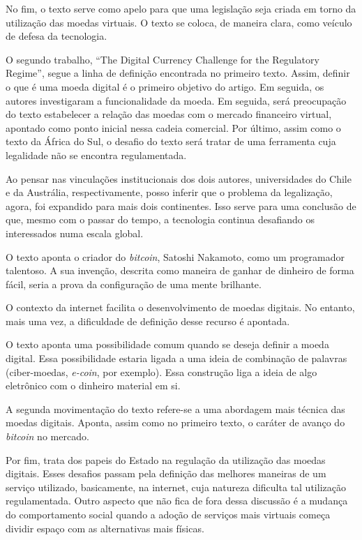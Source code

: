 \documentclass[12pt]{article}
\begin{document}
No fim, o texto serve como apelo para que uma legislação seja criada em torno da utilização das moedas virtuais. O texto se coloca, de maneira clara, como veículo de defesa da tecnologia.

O segundo trabalho, “The Digital Currency Challenge for the Regulatory Regime”, segue a linha de definição encontrada no primeiro texto. Assim, definir o que é uma moeda digital é o primeiro objetivo do artigo. Em seguida, os autores investigaram a funcionalidade da moeda. Em seguida, será preocupação do texto estabelecer a relação das moedas com o mercado financeiro virtual, apontado como ponto inicial nessa cadeia comercial. Por último, assim como o texto da África do Sul, o desafio do texto será tratar de uma ferramenta cuja legalidade não se encontra regulamentada.

Ao pensar nas vinculações institucionais dos dois autores, universidades do Chile e da Austrália, respectivamente, posso inferir que o problema da legalização, agora, foi expandido para mais dois continentes. Isso serve para uma conclusão de que, mesmo com o passar do tempo, a tecnologia continua desafiando os interessados numa escala global.

O texto aponta o criador do \textit{bitcoin}, Satoshi Nakamoto, como um programador talentoso. A sua invenção, descrita como maneira de ganhar de dinheiro de forma fácil, seria a prova da configuração de uma mente brilhante.

O contexto da internet facilita o desenvolvimento de moedas digitais. No entanto, mais uma vez, a dificuldade de definição desse recurso é apontada.

O texto aponta uma possibilidade comum quando se deseja definir a moeda digital. Essa possibilidade estaria ligada a uma ideia  de combinação de palavras (ciber-moedas, \textit{e-coin}, por exemplo). Essa construção liga a ideia de algo eletrônico com o dinheiro material em si. 

A segunda movimentação do texto refere-se a uma abordagem mais técnica das moedas digitais. Aponta, assim como no primeiro texto, o caráter de avanço do \textit{bitcoin} no mercado.

Por fim, trata dos papeis do Estado na regulação da utilização das moedas digitais. Esses desafios passam pela definição das melhores maneiras de um serviço utilizado, basicamente, na internet, cuja natureza dificulta tal utilização regulamentada. Outro aspecto que não fica de fora dessa discussão é a mudança do comportamento social quando a adoção de serviços mais virtuais começa dividir espaço com as alternativas mais físicas.
\end{document}

